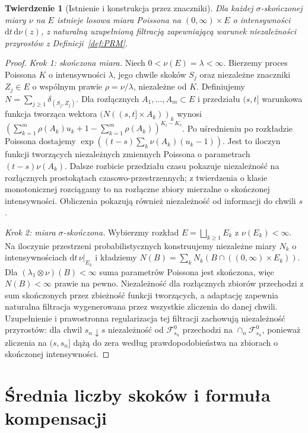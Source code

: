 \documentclass[11pt,a4paper,oneside]{report}
\numberwithin{equation}{chapter}
\theoremstyle{plain}
\newtheorem{twierdzenie}{Twierdzenie}[chapter]
\theoremstyle{definition}
\theoremstyle{remark}
\newcommand{\calF}{\mathcal{F}}
\newcommand{\dd}{\mathrm{d}}
\begin{document}
\begin{twierdzenie}[Istnienie i konstrukcja przez znaczniki]\label{thm:volIII:11:01}
\label{th:prm-existence}
Dla każdej $\sigma$-skończonej miary $\nu$ na $E$ istnieje
losowa miara Poissona na $(0,\infty)\times E$ o intensywności
$\dd t\,\dd\nu(z)$, z naturalną uzupełnioną filtracją
zapewniającą warunek niezależności przyrostów z
Definicji~\ref{def:PRM}.
\end{twierdzenie}
\begin{proof}
\emph{Krok 1: skończona miara.} Niech $0<\nu(E)=\lambda<\infty$.
Bierzemy proces Poissona $K$ o intensywności $\lambda$, jego
chwile skoków $S_j$ oraz niezależne znaczniki $Z_j\in E$ o
wspólnym prawie $\rho=\nu/\lambda$, niezależne od $K$.
Definiujemy $N=\sum_{j\ge1}\delta_{(S_j,Z_j)}$.
Dla rozłącznych $A_1,\ldots,A_m\subset E$ i przedziału
$(s,t]$ warunkowa funkcja tworząca wektora
$(N((s,t]\times A_k))_k$ wynosi
$(\sum_{k=1}^m\rho(A_k)u_k+1-\sum_{k=1}^m\rho(A_k))^{K_t-K_s}$.
Po uśrednieniu po rozkładzie Poissona dostajemy
$\exp((t-s)\sum_k\nu(A_k)(u_k-1))$.
Jest to iloczyn funkcji tworzących niezależnych zmiennych
Poissona o parametrach $(t-s)\nu(A_k)$.
Dalsze rozbicie przedziału czasu pokazuje niezależność na
rozłącznych prostokątach czasowo-przestrzennych; z twierdzenia
o klasie monotonicznej rozciągamy to na rozłączne zbiory
mierzalne o skończonej intensywności. Obliczenia pokazują
również niezależność od informacji do chwili $s$.

\emph{Krok 2: miara $\sigma$-skończona.} Wybierzmy rozkład
$E=\bigsqcup_{k\ge1}E_k$ z $\nu(E_k)<\infty$.
Na iloczynie przestrzeni probabilistycznych konstruujemy niezależne
miary $N_k$ o intensywnościach $\dd t\,\nu|_{E_k}$ i kładziemy
$N(B)=\sum_kN_k(B\cap((0,\infty)\times E_k))$.
Dla $(\lambda_1\otimes\nu)(B)<\infty$ suma parametrów Poissona
jest skończona, więc $N(B)<\infty$ prawie na pewno.
Niezależność dla rozłącznych zbiorów przechodzi z sum skończonych
przez zbieżność funkcji tworzących, a adaptację zapewnia naturalna
filtracja wygenerowana przez wszystkie zliczenia do danej chwili.
Uzupełnienie i prawostronna regularizacja tej filtracji zachowują
niezależność przyrostów: dla chwil $s_n\downarrow s$ niezależność
od $\calF^0_{s_n}$ przechodzi na $\cap_n\calF^0_{s_n}$, ponieważ
zliczenia na $(s,s_n]$ dążą do zera według prawdopodobieństwa
na zbiorach o skończonej intensywności.
\end{proof}

\section{Średnia liczby skoków i formuła kompensacji}\label{sec:volIII:11:02}
\end{document}
